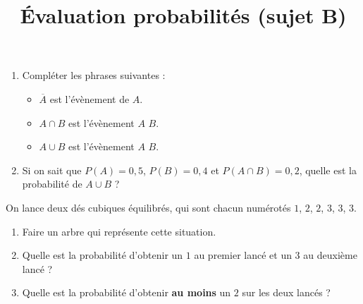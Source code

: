 \documentclass[
	classe=$2^{de}$
]{évaluation}
\begin{document}

\newpage\setcounter{exercice}{1}
\title{Évaluation probabilités (sujet B)}
\maketitle

\begin{exercice}[2,5]
	\begin{enumerate}
		\item Compléter les phrases suivantes :
		\begin{itemize}
			\item $\overline{A}$ est l'évènement  de $A$.
			\item $A ∩ B$ est l'évènement $A$  $B$.
			\item $A ∪ B$ est l'évènement $A$  $B$.
		\end{itemize}
		\item Si on sait que $P(A) = 0,5$, $P(B) = 0,4$ et $P(A ∩ B) = 0,2$, quelle est la probabilité de $A ∪ B$ ?
	\end{enumerate}
\end{exercice}

\begin{exercice}[3]
	On lance deux dés cubiques équilibrés, qui sont chacun numérotés $1$, $2$, $2$, $3$, $3$, $3$.
	\begin{enumerate}
		\item Faire un arbre qui représente cette situation.
		\item Quelle est la probabilité d'obtenir un $1$ au premier lancé et un $3$ au deuxième lancé ?
		\item Quelle est la probabilité d'obtenir \textbf{au moins} un $2$ sur les deux lancés ?
	\end{enumerate}
\end{exercice}
\end{document}
